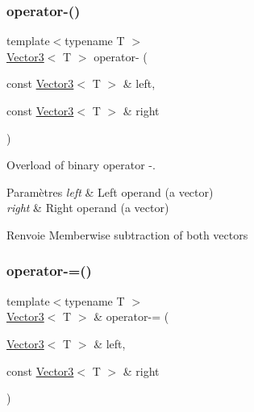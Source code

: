 \subsubsection{\texorpdfstring{operator-\/()}{operator-()}\hspace{0.1cm}{\footnotesize\ttfamily [2/2]}}
{\footnotesize\ttfamily template$<$typename T $>$ \\
\hyperlink{classsf_1_1Vector3}{Vector3}$<$ T $>$ operator-\/ (\begin{DoxyParamCaption}\item[{const \hyperlink{classsf_1_1Vector3}{Vector3}$<$ T $>$ \&}]{left,  }\item[{const \hyperlink{classsf_1_1Vector3}{Vector3}$<$ T $>$ \&}]{right }\end{DoxyParamCaption})\hspace{0.3cm}{\ttfamily [related]}}



Overload of binary operator -\/. 


\begin{DoxyParams}{Paramètres}
{\em left} & Left operand (a vector) \\
\hline
{\em right} & Right operand (a vector)\\
\hline
\end{DoxyParams}
\begin{DoxyReturn}{Renvoie}
Memberwise subtraction of both vectors 
\end{DoxyReturn}
\mbox{\label{classsf_1_1Vector3_aa465672d2a4ee5fd354e585cf08d2ab9}} 
\subsubsection{\texorpdfstring{operator-\/=()}{operator-=()}}
{\footnotesize\ttfamily template$<$typename T $>$ \\
\hyperlink{classsf_1_1Vector3}{Vector3}$<$ T $>$ \& operator-\/= (\begin{DoxyParamCaption}\item[{\hyperlink{classsf_1_1Vector3}{Vector3}$<$ T $>$ \&}]{left,  }\item[{const \hyperlink{classsf_1_1Vector3}{Vector3}$<$ T $>$ \&}]{right }\end{DoxyParamCaption})\hspace{0.3cm}{\ttfamily [related]}}



